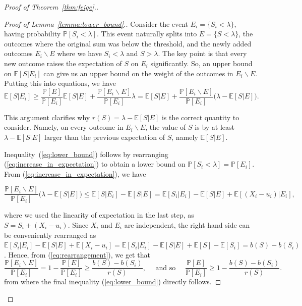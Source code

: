 \documentclass[10pt]{article}
\newcommand{\bE}{\mathbb{E}}
\newcommand{\Pb}{\mathbb P}
\begin{document}
\begin{proof}[Proof of Theorem~\ref{thm:feige}.]
\begin{proof}[Proof of Lemma~\ref{lemma:lower_bound}.]
Consider the event $E_i=\{S_i<\lambda\}$, having probability $\Pb[S_i<\lambda]$. This event naturally splits into $E=\{S<\lambda\}$, the outcomes where the original sum was below the threshold, and the newly added outcomes $E_i\backslash E$ where we have $S_i<\lambda$ and $S>\lambda$. The key point is that every new outcome raises the expectation of $S$ on $E_i$ significantly. So, an upper bound on $\bE[S|E_i]$ can give us an upper bound on the weight of the outcomes in $E_i\backslash E$. Putting this into equations, we have
\vspace{-0.2cm}
\begin{equation}\label{eq:increase_in_expectation}
\bE[S|E_i]\geq \frac{\Pb[E]}{\Pb[E_i]}\bE[S|E]+\frac{\Pb[E_i\backslash E]}{\Pb[E_i]}\lambda=\bE[S|E]+\frac{\Pb[E_i\backslash E]}{\Pb[E_i]}\big(\lambda-\bE[S|E]\big).
\end{equation}
\vspace{-0.4cm}

\noindent
This argument clarifies why $r(S)=\lambda-\bE[S|E]$ is the correct quantity to consider. Namely, on every outcome in $E_i\backslash E$, the value of $S$ is by at least $\lambda-\bE[S|E]$ larger than the previous expectation of $S$, namely $\bE[S|E]$. 

Inequality~(\ref{eq:lower_bound}) follows by rearranging (\ref{eq:increase_in_expectation}) to obtain a lower bound on $\Pb[S_i<\lambda]=\Pb[E_i]$. From (\ref{eq:increase_in_expectation}), we have 

\begin{equation}\label{eq:rearrangement}
    \frac{\Pb[E_i\backslash E]}{\Pb[E_i]}\big(\lambda-\bE[S|E]\big)\leq \bE[S|E_i]-\bE[S|E]=\bE[S_i|E_i]-\bE[S|E]+\bE[(X_i-u_i)|E_i],
\end{equation}
\vspace{-0.4cm}

\noindent
where we used the linearity of expectation in the last step, as $S=S_i+(X_i-u_i)$. Since $X_i$ and $E_i$ are independent, the right hand side can be conveniently rearranged as $\bE[S_i|E_i]-\bE[S|E]+\bE[X_i-u_i]=\bE[S_i|E_i]-\bE[S|E]+\bE[S]-\bE[S_i]=b(S)-b(S_i)$. Hence, from (\ref{eq:rearrangement}), we get that 
\vspace{-0.2cm}
\begin{equation*}
   \frac{\Pb[E_i\backslash E]}{\Pb[E_i]}= 1-\frac{\Pb[E]}{\Pb[E_i]}\geq \frac{b(S)-b(S_i)}{r(S)}, \quad \text{ and so } \quad \frac{\Pb[E]}{\Pb[E_i]}\geq 1-\frac{b(S)-b(S_i)}{r(S)}.
\end{equation*}
from where the final inequality (\ref{eq:lower_bound}) directly follows.


\end{proof}
\end{proof}
\end{document}
